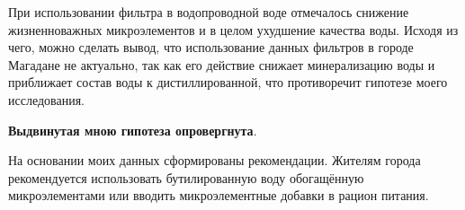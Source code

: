 При использовании фильтра в водопроводной воде отмечалось снижение жизненноважных микроэлементов и в целом ухудшение качества воды. Исходя из чего, можно сделать вывод, что использование данных фильтров в городе Магадане не актуально, так как его действие снижает минерализацию воды и приближает состав воды к дистиллированной, что противоречит гипотезе моего исследования.

\textbf{Выдвинутая мною гипотеза опровергнута}.

На основании моих данных сформированы рекомендации. Жителям города рекомендуется использовать бутилированную воду обогащённую микроэлементами или вводить микроэлементные добавки в рацион питания.
